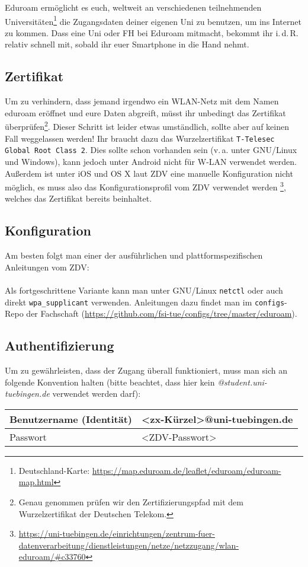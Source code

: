 Eduroam ermöglicht es euch, weltweit an verschiedenen teilnehmenden
Universitäten\footnote{Deutschland-Karte:
\url{https://map.eduroam.de/leaflet/eduroam/eduroam-map.html}} die Zugangsdaten	%
deiner eigenen Uni zu benutzen, um ins Internet zu kommen. Dass eine Uni oder
FH bei Eduroam mitmacht, bekommt ihr i.\,d.\,R. relativ schnell mit, sobald ihr
euer Smartphone in die Hand nehmt.

\subsection*{Zertifikat}
  Um zu verhindern, dass jemand irgendwo ein WLAN-Netz mit dem Namen eduroam
  eröffnet und eure Daten abgreift, müsst ihr unbedingt das Zertifikat
  überprüfen\footnote{Genau genommen prüfen wir den Zertifizierungspfad mit dem
  Wurzelzertifikat der Deutschen Telekom.}. Dieser Schritt ist leider etwas
  umständlich, sollte aber auf keinen Fall weggelassen werden! Ihr braucht dazu das Wurzelzertifikat \glqq\texttt{T-Telesec Global Root Class 2}\grqq. Dies
  sollte schon vorhanden sein (v.\,a. unter GNU/Linux und Windows), kann
  jedoch unter Android nicht für W-LAN verwendet werden. Außerdem ist unter iOS
  und OS X laut ZDV eine manuelle Konfiguration nicht möglich, es muss also das
  Konfigurationsprofil vom ZDV verwendet werden
  \footnote{\url{https://uni-tuebingen.de/einrichtungen/zentrum-fuer-datenverarbeitung/dienstleistungen/netze/netzzugang/wlan-eduroam/\#c33760}},
  welches das Zertifikat bereits beinhaltet.	%

\subsection*{Konfiguration}
  Am besten folgt man einer der ausführlichen und plattformspezifischen
  Anleitungen vom ZDV:\\
  \\
  Als fortgeschrittene Variante kann man unter GNU/Linux \texttt{netctl} oder auch
  direkt \texttt{wpa\_supplicant} verwenden. Anleitungen dazu findet man im
  \texttt{configs}-Repo der Fachschaft
  (\url{https://github.com/fsi-tue/configs/tree/master/eduroam}).	%

\subsection*{Authentifizierung}
\begin{minipage}{\textwidth}
  Um zu gewährleisten, dass der Zugang überall funktioniert, muss man sich an
  folgende Konvention halten (bitte beachtet, dass hier kein
  \emph{@student.uni-tuebingen.de} verwendet werden darf): \medskip \\
  \begin{tabular}{l|l}
    Benutzername (Identität) & <zx-Kürzel>@uni-tuebingen.de \\ \hline
    Passwort                 & <ZDV-Passwort>
  \end{tabular}
\end{minipage}

\vfill
